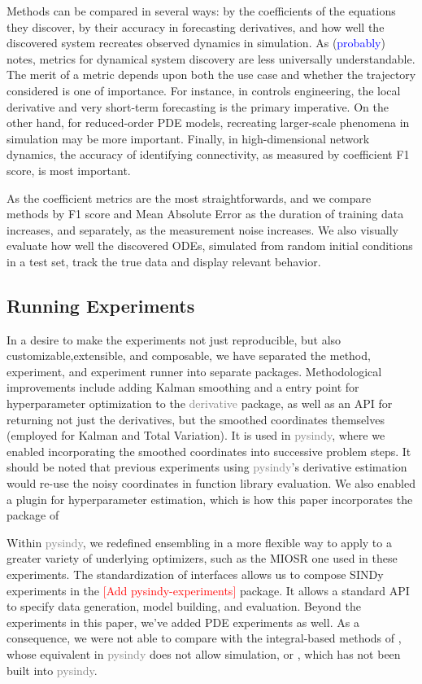 \documentclass{article}
\newcommand{\red}[1]{\textcolor{red}{#1}}
\newcommand{\blue}[1]{\textcolor{blue}{#1}}
\newcommand{\gray}[1]{\textcolor{gray}{#1}}
\begin{document}
Methods can be compared in several ways: by the coefficients of the equations they discover, by their accuracy in forecasting derivatives, and how well the discovered system recreates observed dynamics in simulation.  As \cite{Gilpin2023} (\blue{probably}) notes,  metrics for dynamical system discovery are less universally understandable.  The merit of a metric depends upon both the use case and whether the trajectory considered is one of importance.  For instance, in controls engineering, the local derivative and very short-term forecasting is the primary imperative.  On the other hand, for reduced-order PDE models, recreating larger-scale phenomena in simulation may be more important.  Finally, in high-dimensional network dynamics, the accuracy of identifying connectivity, as measured by coefficient F1 score, is most important.

As the coefficient metrics are the most straightforwards, and we compare methods by F1 score and Mean Absolute Error as the duration of training data increases, and separately, as the measurement noise increases.  We also visually evaluate how well the discovered ODEs, simulated from random initial conditions in a test set, track the true data and display relevant behavior.

\subsection{Running Experiments}

In a desire to make the experiments not just reproducible, but also customizable,extensible, and composable, we have separated the method, experiment, and experiment runner into separate packages.  Methodological improvements include adding Kalman smoothing and a entry point for hyperparameter optimization to the \gray{derivative} package, as well as an API for returning not just the derivatives, but the smoothed coordinates themselves (employed for Kalman and Total Variation).  It is used in \gray{pysindy}, where we enabled incorporating the smoothed coordinates into successive problem steps.  It should be noted that previous experiments using \gray{pysindy}'s derivative estimation would re-use the noisy coordinates in function library evaluation.  We also enabled a plugin for hyperparameter estimation, which is how this paper incorporates the package of \cite{Barratt2020}

Within \gray{pysindy}, we redefined ensembling in a more flexible way to apply to a greater variety of underlying optimizers, such as the MIOSR one used in these experiments.  The standardization of interfaces allows us to compose SINDy experiments in the \red{[Add pysindy-experiments]} package.  It allows a standard API to specify data generation, model building, and evaluation.  Beyond the experiments in this paper, we've added PDE experiments as well.  As a consequence, we were not able to compare with the integral-based methods of \cite{messenger2021bweak}, whose equivalent in \gray{pysindy} does not allow simulation, or \cite{Hirsh2022}, which has not been built into \gray{pysindy}.
\end{document}
